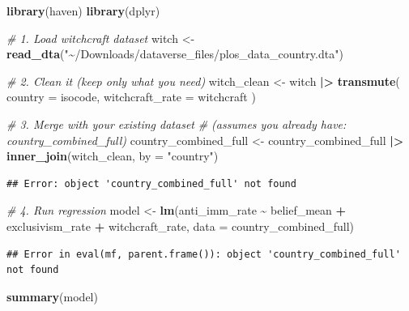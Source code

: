 \documentclass[
]{article}
\newenvironment{Shaded}{\begin{snugshade}}{\end{snugshade}}
\newcommand{\AttributeTok}[1]{\textcolor[rgb]{0.13,0.29,0.53}{#1}}
\newcommand{\CommentTok}[1]{\textcolor[rgb]{0.56,0.35,0.01}{\textit{#1}}}
\newcommand{\FunctionTok}[1]{\textcolor[rgb]{0.13,0.29,0.53}{\textbf{#1}}}
\newcommand{\NormalTok}[1]{#1}
\newcommand{\OtherTok}[1]{\textcolor[rgb]{0.56,0.35,0.01}{#1}}
\newcommand{\SpecialCharTok}[1]{\textcolor[rgb]{0.81,0.36,0.00}{\textbf{#1}}}
\newcommand{\StringTok}[1]{\textcolor[rgb]{0.31,0.60,0.02}{#1}}
\begin{document}
\begin{Shaded}
\begin{Highlighting}[]
\FunctionTok{library}\NormalTok{(haven)}
\FunctionTok{library}\NormalTok{(dplyr)}

\CommentTok{\# 1. Load witchcraft dataset}
\NormalTok{witch }\OtherTok{\textless{}{-}} \FunctionTok{read\_dta}\NormalTok{(}\StringTok{"\textasciitilde{}/Downloads/dataverse\_files/plos\_data\_country.dta"}\NormalTok{)}

\CommentTok{\# 2. Clean it (keep only what you need)}
\NormalTok{witch\_clean }\OtherTok{\textless{}{-}}\NormalTok{ witch }\SpecialCharTok{|\textgreater{}}
  \FunctionTok{transmute}\NormalTok{(}
    \AttributeTok{country =}\NormalTok{ isocode,}
    \AttributeTok{witchcraft\_rate =}\NormalTok{ witchcraft}
\NormalTok{  )}

\CommentTok{\# 3. Merge with your existing dataset}
\CommentTok{\# (assumes you already have: country\_combined\_full)}
\NormalTok{country\_combined\_full }\OtherTok{\textless{}{-}}\NormalTok{ country\_combined\_full }\SpecialCharTok{|\textgreater{}}
  \FunctionTok{inner\_join}\NormalTok{(witch\_clean, }\AttributeTok{by =} \StringTok{"country"}\NormalTok{)}
\end{Highlighting}
\end{Shaded}

\begin{verbatim}
## Error: object 'country_combined_full' not found
\end{verbatim}

\begin{Shaded}
\begin{Highlighting}[]
\CommentTok{\# 4. Run regression}
\NormalTok{model }\OtherTok{\textless{}{-}} \FunctionTok{lm}\NormalTok{(anti\_imm\_rate }\SpecialCharTok{\textasciitilde{}}\NormalTok{ belief\_mean }\SpecialCharTok{+}\NormalTok{ exclusivism\_rate }\SpecialCharTok{+}\NormalTok{ witchcraft\_rate,}
            \AttributeTok{data =}\NormalTok{ country\_combined\_full)}
\end{Highlighting}
\end{Shaded}

\begin{verbatim}
## Error in eval(mf, parent.frame()): object 'country_combined_full' not found
\end{verbatim}

\begin{Shaded}
\begin{Highlighting}[]
\FunctionTok{summary}\NormalTok{(model)}
\end{Highlighting}
\end{Shaded}
\end{document}
